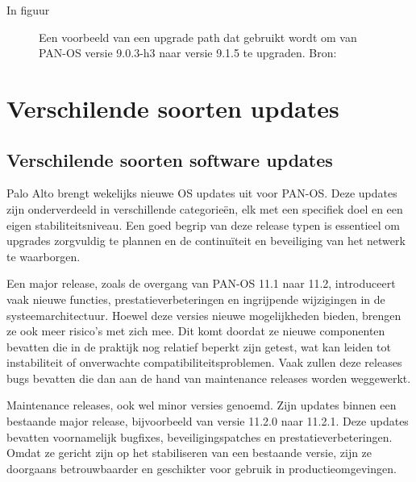 In figuur 
\begin{figure}[H]
    \centering
    \caption[PA High Availability settings]{\label{fig:UpgradePath} Een voorbeeld van een upgrade path dat gebruikt wordt om van PAN-OS versie 9.0.3-h3 naar versie 9.1.5 te upgraden. Bron: \cite{firewallcx2025}}
\end{figure}

\section{Verschilende soorten updates}
\subsection{Verschilende soorten software updates}
Palo Alto brengt wekelijks nieuwe OS updates uit voor PAN-OS. Deze updates zijn onderverdeeld in verschillende categorieën, elk met een specifiek doel en een eigen stabiliteitsniveau. Een goed begrip van deze release typen is essentieel om upgrades zorgvuldig te plannen en de continuïteit en beveiliging van het netwerk te waarborgen.

\vspace{5mm}
Een major release, zoals de overgang van PAN-OS 11.1 naar 11.2, introduceert vaak nieuwe functies, prestatieverbeteringen en ingrijpende wijzigingen in de systeemarchitectuur. Hoewel deze versies nieuwe mogelijkheden bieden, brengen ze ook meer risico’s met zich mee. Dit komt doordat ze nieuwe componenten bevatten die in de praktijk nog relatief beperkt zijn getest, wat kan leiden tot instabiliteit of onverwachte compatibiliteitsproblemen. Vaak zullen deze releases bugs bevatten die dan aan de hand van maintenance releases worden weggewerkt.

\vspace{5mm}
Maintenance releases, ook wel minor versies genoemd. Zijn updates binnen een bestaande major release, bijvoorbeeld van versie 11.2.0 naar 11.2.1. Deze updates bevatten voornamelijk bugfixes, beveiligingspatches en prestatieverbeteringen. Omdat ze gericht zijn op het stabiliseren van een bestaande versie, zijn ze doorgaans betrouwbaarder en geschikter voor gebruik in productieomgevingen.

